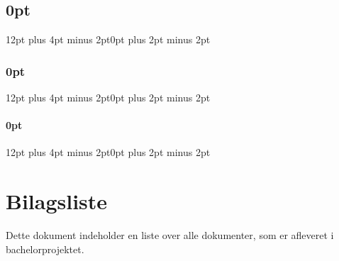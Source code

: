 
\usepackage[explicit]{titlesec}
\usepackage{longtable,tabu}
\usepackage{longtable}
\usepackage{todonotes}

\titlespacing\section{0pt}{12pt plus 4pt minus 2pt}{0pt plus 2pt minus 2pt}
\titlespacing\subsection{0pt}{12pt plus 4pt minus 2pt}{0pt plus 2pt minus 2pt}
\titlespacing\subsubsection{0pt}{12pt plus 4pt minus 2pt}{0pt plus 2pt minus 2pt}
\raggedbottom




\chapter{Bilagsliste}
Dette dokument indeholder en liste over alle dokumenter, som er afleveret i bachelorprojektet. 

